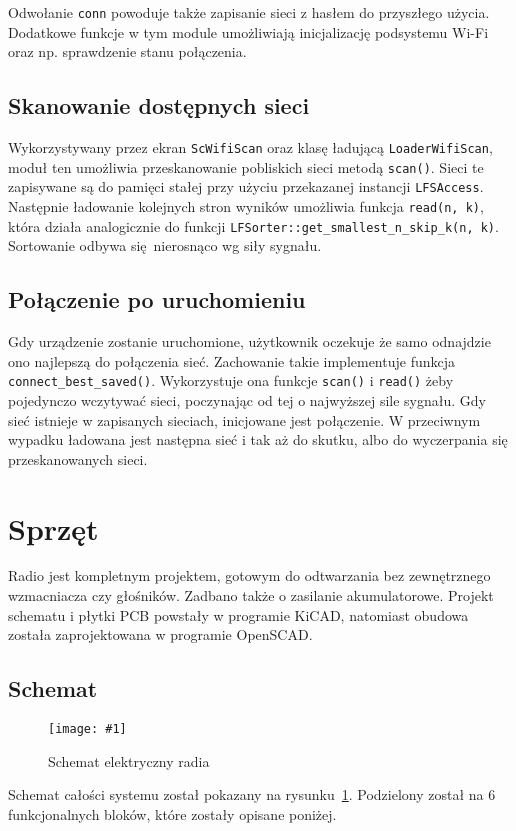 \documentclass[12pt]{report}
\newcommand{\imgint}[4]{
	\begin{figure}[{#4}]
		\centering
		\texttt{[image: \#1]}
		\caption{#2}
		\label{#1}
	\end{figure}
}
\newcommand{\imgh}[3]{\imgint{#1}{#2}{#3}{H}}
\begin{document}
			Odwołanie \lstinline|conn| powoduje także zapisanie sieci z hasłem do przyszłego użycia. Dodatkowe funkcje w tym module umożliwiają inicjalizację podsystemu Wi-Fi oraz np. sprawdzenie stanu połączenia.
			
		\subsection{Skanowanie dostępnych sieci}
			Wykorzystywany przez ekran \lstinline|ScWifiScan| oraz klasę ładującą \lstinline|LoaderWifiScan|, moduł ten umożliwia przeskanowanie pobliskich sieci metodą \lstinline|scan()|. Sieci te zapisywane są do pamięci stałej przy użyciu przekazanej instancji \lstinline|LFSAccess|. Następnie ładowanie kolejnych stron wyników umożliwia funkcja \lstinline|read(n, k)|, która działa analogicznie do funkcji \lstinline|LFSorter::get_smallest_n_skip_k(n, k)|. Sortowanie odbywa się nierosnąco wg siły sygnału.
			
		\subsection{Połączenie po uruchomieniu}
			Gdy urządzenie zostanie uruchomione, użytkownik oczekuje że samo odnajdzie ono najlepszą do połączenia sieć. Zachowanie takie implementuje funkcja \lstinline|connect_best_saved()|. Wykorzystuje ona funkcje \lstinline|scan()| i \lstinline|read()| żeby pojedynczo wczytywać sieci, poczynając od tej o najwyższej sile sygnału. Gdy sieć istnieje w zapisanych sieciach, inicjowane jest połączenie. W przeciwnym wypadku ładowana jest następna sieć i tak aż do skutku, albo do wyczerpania się przeskanowanych sieci.
		
	\section{Sprzęt}
		Radio jest kompletnym projektem, gotowym do odtwarzania bez zewnętrznego wzmacniacza czy głośników. Zadbano także o zasilanie akumulatorowe. Projekt schematu i płytki PCB powstały w programie KiCAD\textsuperscript{\cite{hw_kicad}}, natomiast obudowa została zaprojektowana w programie OpenSCAD\textsuperscript{\cite{hw_openscad}}.
	
		\subsection{Schemat}
			\imgh{3/hw_kicad_sch}{Schemat elektryczny radia}{1}
			
			Schemat całości systemu został pokazany na rysunku~\ref{3/hw_kicad_sch}. Podzielony został na 6 funkcjonalnych bloków, które zostały opisane poniżej.
			
\end{document}
